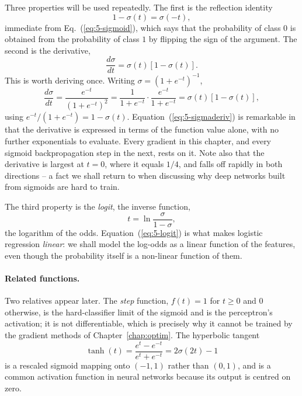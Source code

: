 Three properties will be used repeatedly.  The first is the reflection
identity
\begin{equation}
  1-\sigma(t) = \sigma(-t),
  \label{eq:5-sigmareflect}
\end{equation}
immediate from Eq.~(\ref{eq:5-sigmoid}), which says that the probability of
class $0$ is obtained from the probability of class $1$ by flipping the sign
of the argument.  The second is the derivative,
\begin{equation}
  \boxed{\;
  \frac{d\sigma}{dt} = \sigma(t)\left[1-\sigma(t)\right] . \;}
  \label{eq:5-sigmaderiv}
\end{equation}
This is worth deriving once.  Writing $\sigma=(1+e^{-t})^{-1}$,
\[
  \frac{d\sigma}{dt} = \frac{e^{-t}}{\left(1+e^{-t}\right)^{2}}
   = \frac{1}{1+e^{-t}}\cdot\frac{e^{-t}}{1+e^{-t}}
   = \sigma(t)\left[1-\sigma(t)\right],
\]
using $e^{-t}/(1+e^{-t})=1-\sigma(t)$.  Equation~(\ref{eq:5-sigmaderiv}) is
remarkable in that the derivative is expressed in terms of the function value
alone, with no further exponentials to evaluate.  Every gradient in this
chapter, and every sigmoid backpropagation step in the next, rests on it.
Note also that the derivative is largest at $t=0$, where it equals $1/4$, and
falls off rapidly in both directions -- a fact we shall return to when
discussing why deep networks built from sigmoids are hard to train.

The third property is the \emph{logit}, the inverse function,
\begin{equation}
  t = \ln\frac{\sigma}{1-\sigma},
  \label{eq:5-logit}
\end{equation}
the logarithm of the odds.  Equation~(\ref{eq:5-logit}) is what makes logistic
regression \emph{linear}: we shall model the log-odds as a linear function of
the features, even though the probability itself is a non-linear function of
them.

\paragraph{Related functions.}
Two relatives appear later.  The \emph{step} function, $f(t)=1$ for $t\ge0$
and $0$ otherwise, is the hard-classifier limit of the sigmoid and is the
perceptron's activation; it is not differentiable, which is precisely why it
cannot be trained by the gradient methods of Chapter~\ref{chap:optim}.  The
hyperbolic tangent
\begin{equation}
  \tanh(t) = \frac{e^{t}-e^{-t}}{e^{t}+e^{-t}} = 2\sigma(2t)-1
  \label{eq:5-tanh}
\end{equation}
is a rescaled sigmoid mapping onto $(-1,1)$ rather than $(0,1)$, and is a
common activation function in neural networks because its output is centred on
zero.

